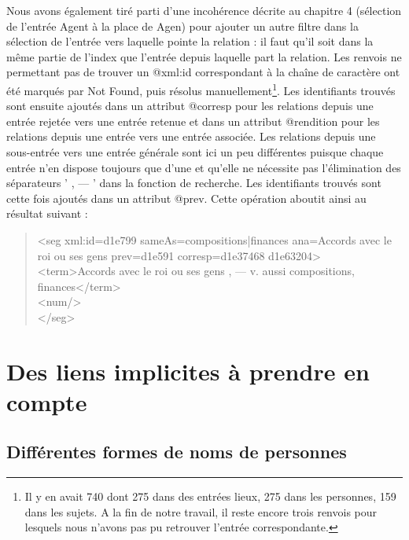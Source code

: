 \documentclass[a4paper,12pt,twoside]{book}
\begin{document}
	Nous avons également tiré parti d'une incohérence décrite au chapitre 4 (sélection de l'entrée \og Agent\fg{} à la place de \og Agen\fg{}) pour ajouter un autre filtre dans la sélection de l'entrée vers laquelle pointe la relation : il faut qu'il soit dans la même partie de l'index que l'entrée depuis laquelle part la relation. Les renvois ne permettant pas de trouver un @xml:id correspondant à la chaîne de caractère ont été marqués par \og Not Found\fg{}, puis résolus manuellement\footnote{Il y en avait 740 dont 275 dans des entrées lieux, 275 dans les personnes, 159 dans les sujets. A la fin de notre travail, il reste encore trois renvois pour lesquels nous n'avons pas pu retrouver l'entrée correspondante.}. Les identifiants trouvés sont ensuite ajoutés dans un attribut @corresp pour les relations depuis une entrée rejetée vers une entrée retenue et dans un attribut @rendition pour les relations depuis une entrée vers une entrée associée. Les relations depuis une sous-entrée vers une entrée générale sont ici un peu différentes puisque chaque entrée n'en dispose toujours que d'une et qu'elle ne nécessite pas l'élimination des séparateurs ' , — ' dans la fonction de recherche. Les identifiants trouvés sont cette fois ajoutés dans un attribut @prev. Cette opération aboutit ainsi au résultat suivant :
	
	\begin{quotation}
               <seg xml:id=\textquotesingle d1e799\textquotesingle{} sameAs=\textquotesingle compositions|finances\textquotesingle{} ana=\textquotesingle Accords avec le roi ou ses gens\textquotesingle{} prev=\textquotesingle d1e591\textquotesingle{} corresp=\textquotesingle d1e37468 d1e63204\textquotesingle >\\
				\indent\indent<term>Accords avec le roi ou ses gens , — v. aussi compositions, finances</term>\\
				\indent\indent<num/>\\
				\indent</seg>
	\end{quotation}

	\section{Des liens implicites à prendre en compte}
	
	\subsection{Différentes formes de noms de personnes}
	
\end{document}
